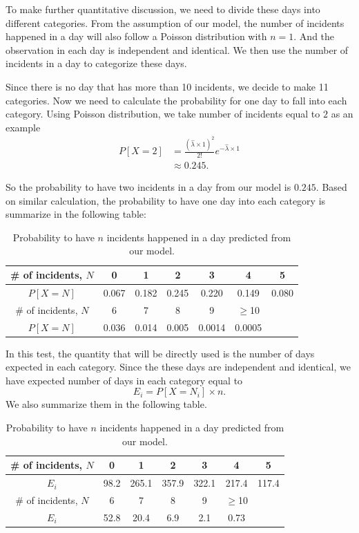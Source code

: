 \documentclass[11pt,a4paper,english]{article}
\begin{document}
To make further quantitative discussion, we need to divide these days into different categories. 
From the assumption of our model, the number of incidents happened in a day will also follow a Poisson distribution with $n = 1$. 
And the observation in each day is independent and identical. We then use the number of incidents in a day to categorize these days.

Since there is no day that has more than 10 incidents, we decide to make 11 categories. Now we need to calculate the probability for one day to fall into each category. Using Poisson distribution, we take number of incidents equal to $2$ as an example
\begin{align*}
	P[X = 2] &= \frac{\left(\hat{\lambda}\times 1\right)^{2}}{2!}
	e^{-\hat{\lambda} \times 1} \\
	&\approx 0.245.
\end{align*}

So the probability to have two incidents in a day from our model is $0.245$.
Based on similar calculation, the probability to have one day into each category is summarize in the following table:
\begin{table}[htbp]
    \centering
	\begin{tabular}{c|cccccc}
		\hline
		\# of incidents, $N$ & 0 & 1 & 2 & 3 & 4 & 5\\
		\hline
		$P[X = N]$ & 0.067 & 0.182 & 0.245 & 0.220 & 0.149 & 0.080\\ 
		\hline
		\# of incidents, $N$  & 6 & 7 & 8 & 9 & $\geq$10 & \\
		\hline
		$P[X = N]$  & 0.036 & 0.014 & 0.005 & 0.0014 & 0.0005 & \\ 
		\hline
    \end{tabular}
	\caption{Probability to have $n$ incidents happened in a day predicted from our model.}
\end{table}

In this test, the quantity that will be directly used is the number of days expected in each category. Since the these days are independent and identical, we have expected number of days in each category equal to
\begin{equation*}
	E_{i} = P[X = N_{i}] \times n.
\end{equation*}
We also summarize them in the following table.

\begin{table}[htbp]
    \centering
	\begin{tabular}{c|cccccc}
		\hline
		\# of incidents, $N$ & 0 & 1 & 2 & 3 & 4 & 5\\
		\hline
		$E_{i}$ & 98.2 & 265.1 & 357.9 & 322.1 & 217.4 & 117.4\\ 
		\hline
		\# of incidents, $N$  & 6 & 7 & 8 & 9 & $\geq$10 & \\
		\hline
		$E_{i}$  & 52.8 & 20.4 & 6.9 & 2.1 & 0.73 & \\ 
		\hline
    \end{tabular}
	\caption{Probability to have $n$ incidents happened in a day predicted from our model.}
\end{table}
\end{document}
